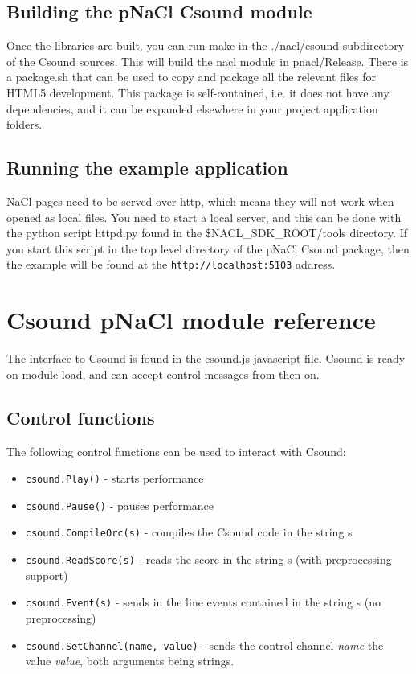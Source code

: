 \documentclass[11pt]{article}
\begin{document}
\subsection{Building the pNaCl Csound module}

Once the libraries are built, you can run make in the ./nacl/csound subdirectory of the Csound sources. This will build the
nacl module in  pnacl/Release. There is a package.sh that can be used to copy and package all the relevant files for 
HTML5 development. This package is self-contained, i.e. it does not have any dependencies, and it can be expanded
elsewhere in your project application folders. 


\subsection{Running the example application}

NaCl pages need to be served over http, which means they will not work when opened as local files. You need to start a local server,
and this can be done with the python script httpd.py found in the \$NACL\_SDK\_ROOT/tools directory. If you start this script 
in the top level directory of the pNaCl Csound package, then the example will be found at the {\tt http://localhost:5103} address.

\section{Csound pNaCl module reference}

The interface to Csound is found in the csound.js javascript file. Csound is ready on module load, and can accept control messages
from then on.

\subsection{Control functions}

The following control functions can be used to interact with Csound:

\begin{itemize}
\item {\tt csound.Play()} - starts performance
\item {\tt csound.Pause()} - pauses performance
\item {\tt csound.CompileOrc(s)} - compiles the Csound code in the string s
\item {\tt csound.ReadScore(s)} - reads the score in the string s (with preprocessing support)
\item {\tt csound.Event(s)} - sends in the line events contained in the string s (no preprocessing)
\item {\tt csound.SetChannel(name, value)} - sends the control channel \emph{name} the value \emph{value}, both arguments being strings.
\end{itemize}
\end{document}
